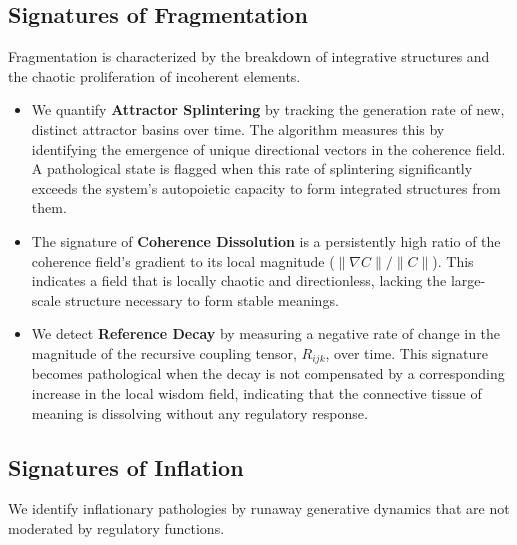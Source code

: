 
\subsection{Signatures of Fragmentation}
\label{16.2.2:signatures_of_fragmentation}

Fragmentation is characterized by the breakdown of integrative structures and the chaotic proliferation of incoherent elements.

\begin{itemize}

    \item We quantify \textbf{Attractor Splintering} by tracking the generation rate of new, distinct attractor basins over time. The algorithm measures this by identifying the emergence of unique directional vectors in the coherence field. A pathological state is flagged when this rate of splintering significantly exceeds the system's autopoietic capacity to form integrated structures from them.

    \item The signature of \textbf{Coherence Dissolution} is a persistently high ratio of the coherence field's gradient to its local magnitude (\(\|\nabla C\| / \|C\|\)). This indicates a field that is locally chaotic and directionless, lacking the large-scale structure necessary to form stable meanings.

    \item We detect \textbf{Reference Decay} by measuring a negative rate of change in the magnitude of the recursive coupling tensor, \(R_{ijk}\), over time. This signature becomes pathological when the decay is not compensated by a corresponding increase in the local wisdom field, indicating that the connective tissue of meaning is dissolving without any regulatory response.

\end{itemize}


\subsection{Signatures of Inflation}
\label{16.2.3:signatures_of_inflation}

We identify inflationary pathologies by runaway generative dynamics that are not moderated by regulatory functions.

